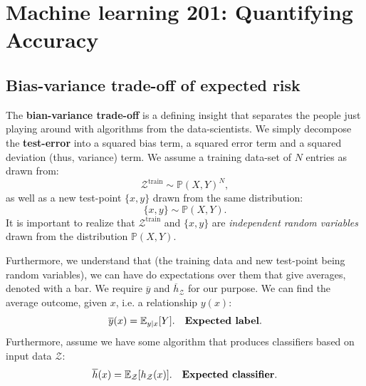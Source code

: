 \documentclass{article}
\begin{document}
\newpage

\section{Machine learning 201: Quantifying Accuracy}
\subsection{Bias-variance trade-off of expected risk}
The \textbf{bian-variance trade-off} is a defining insight that separates the people just playing around with algorithms from the data-scientists. We simply decompose the \textbf{test-error} into a squared bias term, a squared error term and a squared deviation (thus, variance) term. We assume a training data-set of $N$ entries as drawn from:
\begin{equation}
    \mathcal{Z}^\text{train}\sim \mathbb{P}(X,Y)^N,
\end{equation}
as well as a new test-point $\{x,y\}$ drawn from the same distribution:
\begin{equation}
    \{x,y\}\sim \mathbb{P}(X,Y).
\end{equation}
It is important to realize that $\mathcal{Z}^\text{train}$ and $\{x,y\}$ are \textit{independent random variables} drawn from the distribution $\mathbb{P}(X,Y)$.

Furthermore, we understand that (the training data and new test-point being random variables), we can have do expectations over them that give averages, denoted with a bar. We require $\overline{y}$ and $\overline{h}_\mathcal{Z}$ for our purpose. We can find the average outcome, given $x$, i.e. a relationship $y(x)$:
\begin{equation}
    \overline{y}(x) = \mathbb{E}_{y|x}[Y].\quad\text{\textbf{Expected label}}.
\end{equation}
Furthermore, assume we have some algorithm that produces classifiers based on input data $\mathcal{Z}$:
\begin{equation}
    \overline{h}(x) = \mathbb{E}_{\mathcal{Z}}[h_\mathcal{Z}(x)]. \quad\text{\textbf{Expected classifier}}.
\end{equation}
\end{document}
